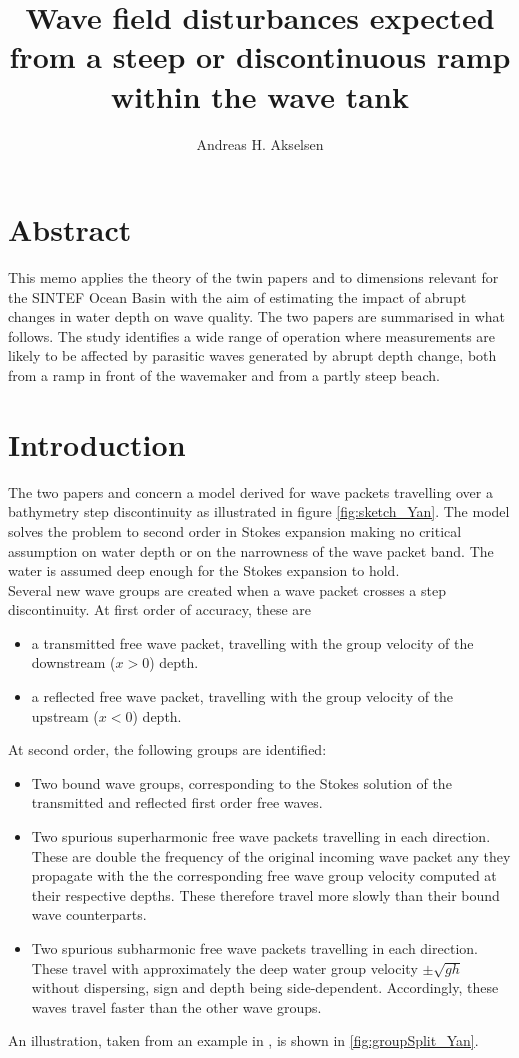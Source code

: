 \documentclass[internal]{sintefmemo}
\title{Wave field disturbances expected from a steep or discontinuous ramp within the wave tank}
\author{Andreas H. Akselsen}
\begin{document}
\frontmatter

\section{Abstract}
This memo applies the theory of the twin papers \citet{li_2021_step1} and \citet{li_2021_step2} to dimensions relevant for the SINTEF Ocean Basin with the aim of estimating the impact of abrupt changes in water depth on wave quality.
The two papers are summarised in what follows.
The study identifies a wide range of operation where measurements are likely to be affected by parasitic waves generated by abrupt depth change, both from a ramp in front of the wavemaker and from a partly steep beach.

\section{Introduction}

The two papers \citet{li_2021_step1} and \citet{li_2021_step2} concern a model derived for wave packets travelling over a bathymetry step discontinuity  as illustrated in figure \ref{fig:sketch_Yan}.
The model solves the problem to second order in Stokes expansion making no critical assumption on water depth or on the narrowness of the wave packet band.
The water is assumed deep enough for the Stokes expansion to hold.
\\

Several new wave groups are created when a wave packet crosses a step discontinuity. 
At first order of accuracy, these are
\begin{itemize}
	\item a transmitted free wave packet, travelling with the group velocity of the downstream ($x>0$) depth.
	\item a reflected free wave packet, travelling with the group velocity of the upstream ($x<0$) depth.
\end{itemize}
At second order, the following groups are identified:
\begin{itemize}
	\item Two bound wave groups, corresponding to the Stokes solution of the transmitted and reflected first order free waves.
	\item Two spurious superharmonic free wave packets travelling in each direction. These are double the frequency of the original incoming wave packet any they propagate with the the corresponding free wave group velocity computed at their respective depths. These therefore travel more slowly than their bound wave counterparts.
	\item Two spurious subharmonic free wave packets travelling in each direction. These travel with approximately the deep water group velocity $\pm\sqrt{gh}$ without dispersing, sign and depth being side-dependent. Accordingly, these waves travel faster than the other wave groups.
\end{itemize}
An illustration, taken from an example in \citet{li_2021_step1}, is shown in \autoref{fig:groupSplit_Yan}.
\end{document}
